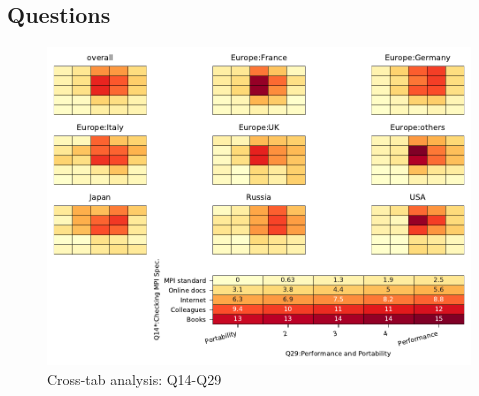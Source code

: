 
\subsection{Questions}


\begin{figure}
\begin{center}
\includegraphics[width=12cm]{../pdfs/Q14-Q29.pdf}
\caption{Cross-tab analysis: Q14-Q29}
\label{fig:Q14-Q29}
\end{center}
\end{figure}
